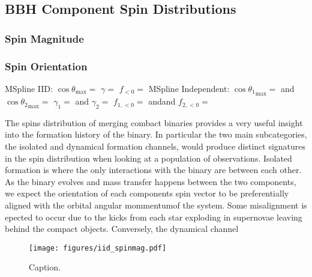 \subsection{BBH Component Spin Distributions} \label{sec:spin_dist}

\subsubsection{Spin Magnitude}

\subsubsection{Spin Orientation}

MSpline IID:
$\cos{\theta}_\mathrm{max} = $\result{$\CIPlusMinus{\macros[MSplineIIDCompSpins][peakCosTilt]}$}
$\gamma = $
$f_{<0} = $\result{$\CIPlusMinus{\macros[MSplineIIDCompSpins][negFrac]}$}
MSpline Independent:
$\cos{\theta_1}_\mathrm{max} = $\result{$\CIPlusMinus{\macros[MSplineIndependentCompSpins][peakCosTilt1]}$} and $\cos{\theta_2}_\mathrm{max} = $\result{$\CIPlusMinus{\macros[MSplineIndependentCompSpins][peakCosTilt2]}$}
$\gamma_1 = $ and $\gamma_2 = $ 
$f_{1,<0} = $\result{$\CIPlusMinus{\macros[MSplineIndependentCompSpins][negFrac1]}$} andand $f_{2,<0} = $\result{$\CIPlusMinus{\macros[MSplineIndependentCompSpins][negFrac2]}$}


The spins distribution of merging combact binaries provides a very useful insight into the formation history of the binary. In particular the two main subcategories, 
the isolated and dynamical formation channels, would produce distinct signatures in the spin distribution when looking at a population of observations. Isolated formation
is where the only interactions with the binary are between each other. As the binary evolves and mass transfer happens between the two components, we expect the orientation
of each components spin vector to be preferentially aligned with the orbital angular mommentumof the system. Some misalignment is epected to occur due to the kicks from 
each star exploding in supernovae leaving behind the compact objects. Conversely, the dynamical channel     
\begin{figure}
    \texttt{[image: figures/iid\_spinmag.pdf]}
    \caption{Caption.}
    \label{fig:iid_spinmag_dist}
\end{figure}

